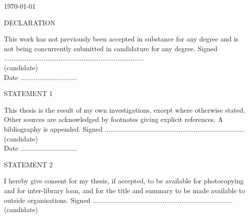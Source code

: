 \begin{titlepage}
\begin{center}
\noindent
\today
\end{center}
%
\newpage
\begin{Large}
\noindent
DECLARATION\\
\end{Large}
\newline	
This work has not previously been accepted in substance for any degree and is not being concurrently submitted in candidature for any degree.	
\newline
\newline
Signed ..........................................................................\\
(candidate)	\\
\newline
Date ..............................\\
\newline
\newline
\begin{large}
\noindent
STATEMENT 1\\
\end{large}
\newline
This thesis is the result of my own investigations, except where otherwise stated. Other sources are acknowledged by footnotes giving explicit references.  A bibliography is appended.
\newline
\newline
Signed ..........................................................................\\
(candidate)	\\
\newline
Date ..............................\\
\newline
\newline
\begin{large}
\noindent
STATEMENT 2	\\
\end{large}
\newline
I hereby give consent for my thesis, if accepted, to be available for photocopying and for inter-library loan, and for the title and summary to be made available to outside organisations.	
\newline
\newline
Signed ..........................................................................\\
(candidate)	\\

\end{titlepage}
